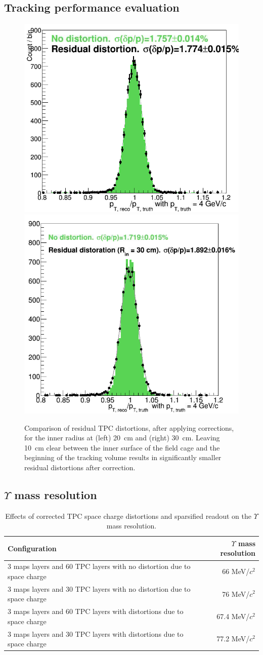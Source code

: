 \subsection{Tracking performance evaluation}

\begin{figure}[hbt]
  \centering
  \includegraphics[width=0.4\linewidth]{figs/tpc_residual_correction_20cm}
  \hspace{0.1\linewidth}
  \includegraphics[width=0.4\linewidth]{figs/tpc_residual_correction_30cm}
  \caption{Comparison of residual TPC distortions, after applying
    corrections, for the inner radius at (left) 20~cm and (right)
    30~cm. Leaving 10~cm clear between the inner surface of the field
    cage and the beginning of the tracking volume results in
    significantly smaller residual distortions after correction.}
  \label{fig:tpc_residuals}
\end{figure}

\subsection{$\Upsilon$ mass resolution}


\begin{table}
  \centering
  \begin{tabular}{lr}
    \toprule
    Configuration & $\Upsilon$ mass resolution \\
    \midrule
3 maps layers and 60 TPC layers with no distortion due to space charge
&  66 MeV/$c^2$ \\
3 maps layers and 30 TPC layers with no distortion due to space charge
& 76 MeV/$c^2$ \\
3 maps layers and 60 TPC layers with distortions due to space charge
& 67.4 MeV/$c^2$ \\
3 maps layers and 30 TPC layers with distortions due to space charge
& 77.2 MeV/$c^2$ \\
    \bottomrule
  \end{tabular}
  \caption{Effects of corrected TPC space charge distortions and sparsified readout on the $\Upsilon$ mass resolution.}
  \label{tab:upsilon_mass_resolution}
\end{table}



